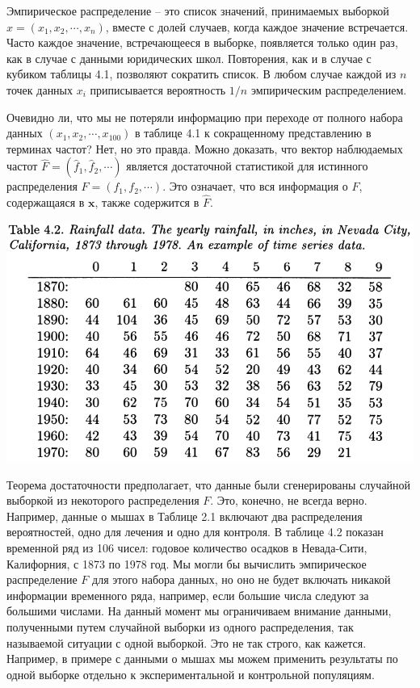 Эмпирическое распределение -- это список значений, принимаемых выборкой $x = (x_1, x_2, \cdots, x_n)$, вместе с долей случаев, когда каждое значение встречается. Часто каждое значение, встречающееся в выборке, появляется только один раз, как в случае с данными юридических школ. Повторения, как и в случае с кубиком таблицы 4.1, позволяют сократить список. В любом случае каждой из $n$ точек данных $x_i$ приписывается вероятность $1 / n$ эмпирическим распределением. 

Очевидно ли, что мы не потеряли информацию при переходе от полного набора данных $(x_1, x_2,\cdots, x_{100})$ в таблице 4.1 к сокращенному представлению в терминах частот? Нет, но это правда. Можно доказать, что вектор наблюдаемых частот $\hat F = (\hat f_1, \hat f_2, \cdots)$ является достаточной статистикой для истинного распределения $F = (f_1, f_2, \cdots)$. Это означает, что вся информация о $F$, содержащаяся в $\mathbf{x}$, также содержится в $\hat F$. 
\newline

\noindent
\includegraphics[width=\linewidth]{3/t42.png}
\newline

Теорема достаточности предполагает, что данные были сгенерированы случайной выборкой из некоторого распределения $F$. Это, конечно, не всегда верно. Например, данные о мышах в Таблице 2.1 включают два распределения вероятностей, одно для лечения и одно для контроля. В таблице 4.2 показан временной ряд из 106 чисел: годовое количество осадков в Невада-Сити, Калифорния, с 1873 по 1978 год. Мы могли бы вычислить эмпирическое распределение $F$ для этого набора данных, но оно не будет включать никакой информации временного ряда, например, если большие числа следуют за большими числами. На данный момент мы ограничиваем внимание данными, полученными путем случайной выборки из одного распределения, так называемой ситуации с одной выборкой. Это не так строго, как кажется. Например, в примере с данными о мышах мы можем применить результаты по одной выборке отдельно к экспериментальной и контрольной популяциям. 

